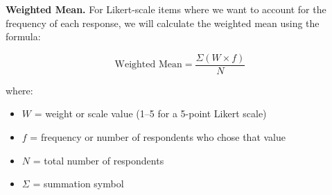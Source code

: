 \documentclass{research}
\begin{document}
\textbf{Weighted Mean.} For Likert-scale items where we want to account for the 
frequency of each response, we will calculate the weighted mean using the formula:

\begin{equation*}
    \text{Weighted Mean} = \frac{\Sigma(W \times f)}{N}
\end{equation*}

\noindent where:
\begin{itemize}[label={}, leftmargin=0pt, itemsep=0pt]
    \item $W$ = weight or scale value (1--5 for a 5-point Likert scale)
    \item $f$ = frequency or number of respondents who chose that value
    \item $N$ = total number of respondents
    \item $\Sigma$ = summation symbol
\end{itemize}


	

\end{document}
